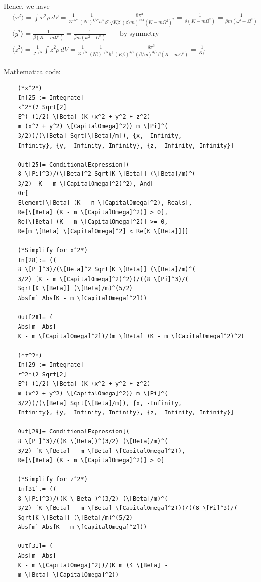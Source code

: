 \documentclass{article}
\theoremstyle{definition}
\newcommand{\be}{\beta}
\newcommand{\f}[2]{\frac{#1}{#2}}
\begin{document}
\begin{enumerate}[label=(\alph*)]
	Hence, we have 
	\begin{align*}
	&\langle x^2 \rangle = \int x^2 \rho\,dV =  \f{1}{\mathcal{Z}^{1/N}} \f{1}{(N!)^{1/N}h^3}\f{8\pi^3}{\be^2\sqrt{K\be}( \be/m)^{3/2}(K-m\Omega^2)^2}  = \f{1}{\be(K-m\Omega^2)} = \boxed{\f{1}{\be m (\omega^2 - \Omega^2)}}\\
	&\langle y^2 \rangle = \f{1}{\be(K-m\Omega^2)}= \boxed{\f{1}{\be m (\omega^2 - \Omega^2)}} \quad\quad \text{by symmetry}\\
	&\langle z^2 \rangle = \f{1}{\mathcal{Z}^{1/N}}\int z^2 \rho\,dV = \f{1}{\mathcal{Z}^{1/N}} \f{1}{(N!)^{1/N}h^3}\f{8\pi^3}{(K\be)^{3/2}(\be/m)^{3/2}\be (K-m\Omega^2)}   = \boxed{\f{1}{K\be}}
	\end{align*}
	
	Mathematica code:
	\begin{lstlisting}
	(*x^2*)
	In[25]:= Integrate[
	x^2*(2 Sqrt[2]
	E^(-(1/2) \[Beta] (K (x^2 + y^2 + z^2) - 
	m (x^2 + y^2) \[CapitalOmega]^2)) m \[Pi]^(
	3/2))/(\[Beta] Sqrt[\[Beta]/m]), {x, -Infinity, 
	Infinity}, {y, -Infinity, Infinity}, {z, -Infinity, Infinity}]
	
	Out[25]= ConditionalExpression[(
	8 \[Pi]^3)/(\[Beta]^2 Sqrt[K \[Beta]] (\[Beta]/m)^(
	3/2) (K - m \[CapitalOmega]^2)^2), And[
	Or[
	Element[\[Beta] (K - m \[CapitalOmega]^2), Reals], 
	Re[\[Beta] (K - m \[CapitalOmega]^2)] > 0], 
	Re[\[Beta] (K - m \[CapitalOmega]^2)] >= 0, 
	Re[m \[Beta] \[CapitalOmega]^2] < Re[K \[Beta]]]]
	
	(*Simplify for x^2*)
	In[28]:= ((
	8 \[Pi]^3)/(\[Beta]^2 Sqrt[K \[Beta]] (\[Beta]/m)^(
	3/2) (K - m \[CapitalOmega]^2)^2))/((8 \[Pi]^3)/(
	Sqrt[K \[Beta]] (\[Beta]/m)^(5/2)
	Abs[m] Abs[K - m \[CapitalOmega]^2]))
	
	Out[28]= (
	Abs[m] Abs[
	K - m \[CapitalOmega]^2])/(m \[Beta] (K - m \[CapitalOmega]^2)^2)
	
	(*z^2*)
	In[29]:= Integrate[
	z^2*(2 Sqrt[2]
	E^(-(1/2) \[Beta] (K (x^2 + y^2 + z^2) - 
	m (x^2 + y^2) \[CapitalOmega]^2)) m \[Pi]^(
	3/2))/(\[Beta] Sqrt[\[Beta]/m]), {x, -Infinity, 
	Infinity}, {y, -Infinity, Infinity}, {z, -Infinity, Infinity}]
	
	Out[29]= ConditionalExpression[(
	8 \[Pi]^3)/((K \[Beta])^(3/2) (\[Beta]/m)^(
	3/2) (K \[Beta] - m \[Beta] \[CapitalOmega]^2)), 
	Re[\[Beta] (K - m \[CapitalOmega]^2)] > 0]
	
	(*Simplify for z^2*)
	In[31]:= ((
	8 \[Pi]^3)/((K \[Beta])^(3/2) (\[Beta]/m)^(
	3/2) (K \[Beta] - m \[Beta] \[CapitalOmega]^2)))/((8 \[Pi]^3)/(
	Sqrt[K \[Beta]] (\[Beta]/m)^(5/2)
	Abs[m] Abs[K - m \[CapitalOmega]^2]))
	
	Out[31]= (
	Abs[m] Abs[
	K - m \[CapitalOmega]^2])/(K m (K \[Beta] - 
	m \[Beta] \[CapitalOmega]^2))
	\end{lstlisting}
\end{enumerate}
\end{document}
